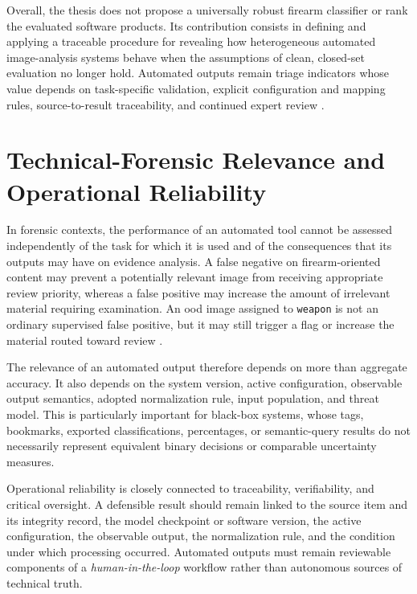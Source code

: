 Overall, the thesis does not propose a universally robust firearm classifier or
rank the evaluated software products. Its contribution consists in defining and
applying a traceable procedure for revealing how heterogeneous automated
image-analysis systems behave when the assumptions of clean, closed-set
evaluation no longer hold. Automated outputs remain triage indicators whose
value depends on task-specific validation, explicit configuration and mapping
rules, source-to-result traceability, and continued expert review
\cite{costantini2019digital,sanna2024preliminary,sanna2025pixelperfect}.

\section{Technical-Forensic Relevance and Operational Reliability}

In forensic contexts, the performance of an automated tool cannot be assessed
independently of the task for which it is used and of the consequences that its
outputs may have on evidence analysis. A false negative on firearm-oriented
content may prevent a potentially relevant image from receiving appropriate
review priority, whereas a false positive may increase the amount of irrelevant
material requiring examination. An \gls{ood} image assigned to
\texttt{weapon} is not an ordinary supervised false positive, but it may still
trigger a flag or increase the material routed toward review
\cite{faqir2023digital,sanna2025cybercrime}.

The relevance of an automated output therefore depends on more than aggregate
accuracy. It also depends on the system version, active configuration,
observable output semantics, adopted normalization rule, input population, and
threat model. This is particularly important for black-box systems, whose tags,
bookmarks, exported classifications, percentages, or semantic-query results do
not necessarily represent equivalent binary decisions or comparable uncertainty
measures.

Operational reliability is closely connected to traceability, verifiability,
and critical oversight. A defensible result should remain linked to the source
item and its integrity record, the model checkpoint or software version, the
active configuration, the observable output, the normalization rule, and the
condition under which processing occurred. Automated outputs must remain
reviewable components of a \textit{human-in-the-loop} workflow rather than
autonomous sources of technical truth.

